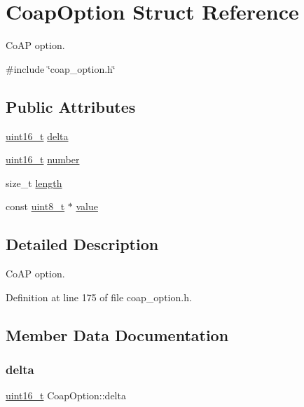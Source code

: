 \hypertarget{structCoapOption}{}\section{Coap\+Option Struct Reference}
\label{structCoapOption}


Co\+AP option.  




{\ttfamily \#include \char`\"{}coap\+\_\+option.\+h\char`\"{}}

\subsection*{Public Attributes}
\begin{DoxyCompactItemize}
\item 
\hyperlink{stdint_8h_a273cf69d639a59973b6019625df33e30}{uint16\+\_\+t} \hyperlink{structCoapOption_af1a2406073cd0bda508b5a0f73f50517}{delta}
\item 
\hyperlink{stdint_8h_a273cf69d639a59973b6019625df33e30}{uint16\+\_\+t} \hyperlink{structCoapOption_a4930b03666d0b61415ce56e7f8b28246}{number}
\item 
size\+\_\+t \hyperlink{structCoapOption_a00ae0190c8ea853add596ed817f912f4}{length}
\item 
const \hyperlink{stdint_8h_aba7bc1797add20fe3efdf37ced1182c5}{uint8\+\_\+t} $\ast$ \hyperlink{structCoapOption_ac57cd3a56c1d18248b7f6d3a5a827aeb}{value}
\end{DoxyCompactItemize}


\subsection{Detailed Description}
Co\+AP option. 

Definition at line 175 of file coap\+\_\+option.\+h.



\subsection{Member Data Documentation}
\mbox{\label{structCoapOption_af1a2406073cd0bda508b5a0f73f50517}} 
\subsubsection{\texorpdfstring{delta}{delta}}
{\footnotesize\ttfamily \hyperlink{stdint_8h_a273cf69d639a59973b6019625df33e30}{uint16\+\_\+t} Coap\+Option\+::delta}



